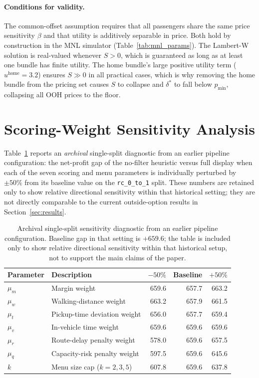 \paragraph{Conditions for validity.} The common-offset assumption requires that all
passengers share the same price sensitivity $\beta$ and that utility is additively
separable in price. Both hold by construction in the MNL simulator
(Table~\ref{tab:mnl_params}). The Lambert-W solution is real-valued whenever
$S > 0$, which is guaranteed as long as at least one bundle has finite utility. The
home bundle's large positive utility term ($u^{\text{home}} = 3.2$) ensures
$S \gg 0$ in all practical cases, which is why removing the home bundle from the
pricing set causes $S$ to collapse and $\delta^*$ to fall below $p_{\min}$,
collapsing all OOH prices to the floor.

\section{Scoring-Weight Sensitivity Analysis}
\label{app:sensitivity}

Table~\ref{tab:sensitivity} reports an \emph{archival} single-split diagnostic from an earlier pipeline configuration: the net-profit gap of the no-filter heuristic versus full display when each of the seven scoring and menu parameters is individually perturbed by $\pm 50\%$ from its baseline value on the \texttt{rc\_0\_to\_1} split. These numbers are retained only to show relative directional sensitivity within that historical setting; they are not directly comparable to the current outside-option results in Section~\ref{sec:results}.

\begin{table}[h]
\centering
\caption{Archival single-split sensitivity diagnostic from an earlier pipeline configuration. Baseline gap in that setting is $+659.6$; the table is included only to show relative directional sensitivity within that historical setup, not to support the main claims of the paper.}
\label{tab:sensitivity}
\begin{tabular}{llrrr}
\hline
Parameter & Description & $-50\%$ & Baseline & $+50\%$ \\
\hline
$\mu_m$ & Margin weight & 659.6 & 657.7 & 663.2 \\
$\mu_w$ & Walking-distance weight & 663.2 & 657.9 & 661.5 \\
$\mu_t$ & Pickup-time deviation weight & 656.0 & 657.7 & 659.4 \\
$\mu_v$ & In-vehicle time weight & 659.6 & 659.6 & 659.6 \\
$\mu_r$ & Route-delay penalty weight & 578.0 & 659.6 & 657.5 \\
$\mu_q$ & Capacity-risk penalty weight & 597.5 & 659.6 & 645.6 \\
$k$ & Menu size cap ($k=2, 3, 5$) & 607.8 & 659.6 & 637.8 \\
\hline
\end{tabular}
\end{table}


